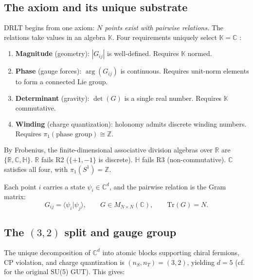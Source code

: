 \documentclass[12pt]{article}
\theoremstyle{remark}
\begin{document}
\subsection{The axiom and its unique substrate}

DRLT begins from one axiom: \emph{$N$ points exist with pairwise
relations.} The relations take values in an algebra $\mathbb{K}$.
Four requirements uniquely select $\mathbb{K} = \mathbb{C}$
\cite{Frobenius}:

\begin{enumerate}
\item[\textbf{R1.}] \textbf{Magnitude} (geometry): $|G_{ij}|$ is
  well-defined. Requires $\mathbb{K}$ normed.
\item[\textbf{R2.}] \textbf{Phase} (gauge forces): $\arg(G_{ij})$ is
  continuous. Requires unit-norm elements to form a connected Lie group.
\item[\textbf{R3.}] \textbf{Determinant} (gravity): $\det(G)$ is a
  single real number. Requires $\mathbb{K}$ commutative.
\item[\textbf{R4.}] \textbf{Winding} (charge quantization): holonomy
  admits discrete winding numbers. Requires
  $\pi_1(\text{phase group}) \cong \mathbb{Z}$.
\end{enumerate}

\noindent
By Frobenius, the finite-dimensional associative division algebras over
$\mathbb{R}$ are $\{\mathbb{R}, \mathbb{C}, \mathbb{H}\}$. $\mathbb{R}$
fails R2 ($\{+1,-1\}$ is discrete). $\mathbb{H}$ fails R3
(non-commutative). $\mathbb{C}$ satisfies all four, with
$\pi_1(S^1) = \mathbb{Z}$.

Each point $i$ carries a state $\psi_i \in \mathbb{C}^d$, and the
pairwise relation is the Gram matrix:
\begin{equation}
G_{ij} = \langle \psi_i | \psi_j \rangle, \qquad
G \in M_{N \times N}(\mathbb{C}), \qquad
\mathrm{Tr}(G) = N.
\end{equation}

\subsection{The $(3,2)$ split and gauge group}

The unique decomposition of $\mathbb{C}^d$ into atomic blocks supporting
chiral fermions, CP violation, and charge quantization is
$(n_S, n_T) = (3, 2)$, yielding $d = 5$ \cite{DRLT-rep}
(cf.\ \cite{Georgi-Glashow} for the original SU(5) GUT). This gives:
\end{document}
